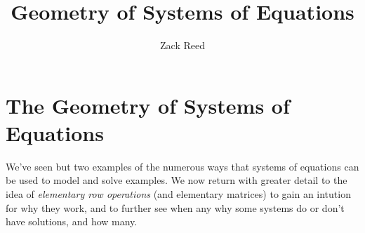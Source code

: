 \documentclass{ximera}
\author{Zack Reed} %
\title{Geometry of Systems of Equations}
\begin{document}
\begin{abstract}

\end{abstract}
\maketitle

\section*{The Geometry of Systems of Equations}

  We've seen but two examples of the numerous ways that systems of equations can be used to model and solve examples. We now return with greater detail to the idea of \emph{elementary row operations} (and elementary matrices) to gain an intution for why they work, and to further see when any why some systems do or don't have solutions, and how many.
\end{document}
